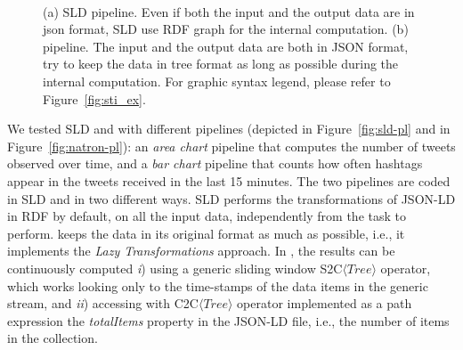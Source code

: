 {\begin{figure}[t]
\centering
{} \\
\caption{(a) SLD pipeline. Even if both the input and the output data are in json format, SLD use RDF graph for the internal computation.
(b) \sti{} pipeline. The input and the output data are both in JSON format, \sti{} try to keep the data in tree format as long as possible during the internal computation.
For graphic syntax legend, please refer to Figure~\ref{fig:sti_ex}.}
\end{figure}

We tested SLD and \sti{} with different pipelines (depicted in Figure~\ref{fig:sld-pl} and in Figure~\ref{fig:natron-pl}): an \textit{area chart} pipeline that computes the number of tweets observed over time, and a \textit{bar chart} pipeline that counts how often hashtags appear in the tweets received in the last 15 minutes.
The two pipelines are coded in SLD and \sti{} in two different ways. 
SLD performs the transformations of JSON-LD in RDF by default, on all the input data, independently from the task to perform. \sti{} keeps the data in its original format as much as possible, i.e., it implements the \textit{Lazy Transformations} approach.
In \sti{}, the results can be continuously computed \textit{i}) using a generic sliding window S2C$\langle Tree \rangle$ operator, which works looking only to the time-stamps of the data items in the generic stream, and \textit{ii}) accessing with C2C$\langle Tree \rangle$ operator implemented as a path expression the \textit{totalItems} property in the JSON-LD file, i.e., the number of items in the collection.

}
